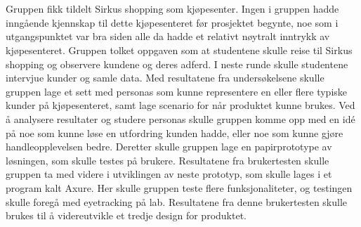 \\\\
Gruppen fikk tildelt Sirkus shopping som kjøpesenter. Ingen i gruppen hadde inngående kjennskap til dette kjøpesenteret før prosjektet begynte, noe som i utgangspunktet var bra siden alle da hadde et relativt nøytralt inntrykk av kjøpesenteret. Gruppen tolket oppgaven som at studentene skulle reise til Sirkus shopping og observere kundene og deres adferd. I neste runde skulle studentene intervjue kunder og samle data. Med resultatene fra undersøkelsene skulle gruppen lage et sett med personas som kunne representere en eller flere typiske kunder på kjøpesenteret, samt lage scenario for når produktet kunne brukes.
Ved å analysere resultater og studere personas skulle gruppen komme opp med en idé på noe som kunne løse en utfordring kunden hadde, eller noe som kunne gjøre handleopplevelsen bedre. Deretter skulle gruppen lage en papirprototype av løsningen, som skulle testes på brukere. Resultatene fra brukertesten skulle gruppen ta med videre i utviklingen av neste prototyp, som skulle lages i et program kalt Axure. Her skulle gruppen teste flere funksjonaliteter, og testingen skulle foregå med eyetracking på lab. Resultatene fra denne brukertesten skulle brukes til å videreutvikle et tredje design for produktet.

